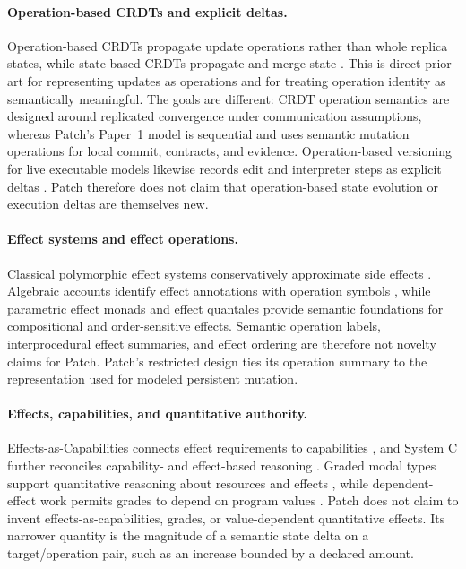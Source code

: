 \paragraph{Operation-based CRDTs and explicit deltas.}
Operation-based CRDTs propagate update operations rather than whole replica states, while state-based CRDTs propagate and merge state \cite{shapiro2011crdt}. This is direct prior art for representing updates as operations and for treating operation identity as semantically meaningful. The goals are different: CRDT operation semantics are designed around replicated convergence under communication assumptions, whereas Patch's Paper~1 model is sequential and uses semantic mutation operations for local commit, contracts, and evidence. Operation-based versioning for live executable models likewise records edit and interpreter steps as explicit deltas \cite{exelmans2025operation}. Patch therefore does not claim that operation-based state evolution or execution deltas are themselves new.

\paragraph{Effect systems and effect operations.}
Classical polymorphic effect systems conservatively approximate side effects \cite{lucassen1988effects}. Algebraic accounts identify effect annotations with operation symbols \cite{kammar2012algebraic}, while parametric effect monads \cite{katsumata2014parametric} and effect quantales \cite{gordon2017flow} provide semantic foundations for compositional and order-sensitive effects. Semantic operation labels, interprocedural effect summaries, and effect ordering are therefore not novelty claims for Patch. Patch's restricted design ties its operation summary to the representation used for modeled persistent mutation.

\paragraph{Effects, capabilities, and quantitative authority.}
Effects-as-Capabilities connects effect requirements to capabilities \cite{brachthaeuser2020effects}, and System C further reconciles capability- and effect-based reasoning \cite{brachthaeuser2022boxes}. Graded modal types support quantitative reasoning about resources and effects \cite{orchard2019quantitative}, while dependent-effect work permits grades to depend on program values \cite{kura2026dependent}. Patch does not claim to invent effects-as-capabilities, grades, or value-dependent quantitative effects. Its narrower quantity is the magnitude of a semantic state delta on a target/operation pair, such as an increase bounded by a declared amount.

